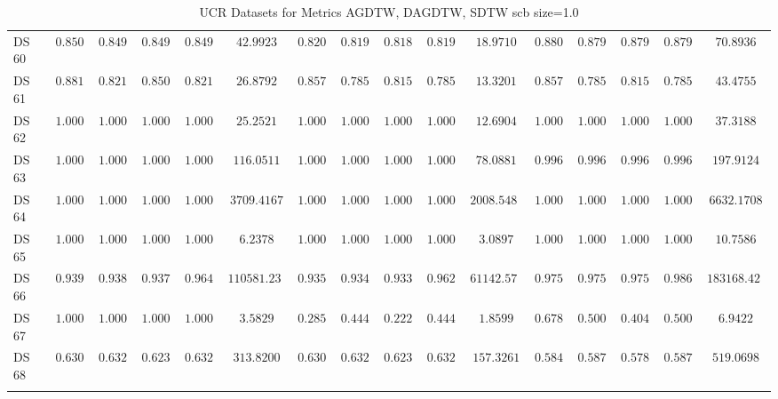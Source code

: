 {\begin{longtable}{|l|ccccc|ccccc|ccccc|}
		DS 60 & $0.8507$ & $0.8498$ & $0.8499$ & $0.8498$ & $42.9923$ & $0.8209$ & $0.8195$ & $0.8189$ & $0.8195$ & $18.9710$ & $\boldsymbol{0.8806}$ & $\boldsymbol{0.8792}$ & $\boldsymbol{0.8793}$ & $\boldsymbol{0.8792}$ & $70.8936$ \\
		DS 61 & $\boldsymbol{0.8810}$ & $\boldsymbol{0.8214}$ & $\boldsymbol{0.8503}$ & $\boldsymbol{0.8214}$ & $26.8792$ & $0.8571$ & $0.7857$ & $0.8152$ & $0.7857$ & $13.3201$ & $0.8571$ & $0.7857$ & $0.8152$ & $0.7857$ & $43.4755$ \\
		DS 62 & $1.0000$ & $1.0000$ & $1.0000$ & $1.0000$ & $25.2521$ & $1.0000$ & $1.0000$ & $1.0000$ & $1.0000$ & $12.6904$ & $\boldsymbol{1.0000}$ & $\boldsymbol{1.0000}$ & $\boldsymbol{1.0000}$ & $\boldsymbol{1.0000}$ & $37.3188$ \\
		DS 63 & $\boldsymbol{1.0000}$ & $\boldsymbol{1.0000}$ & $\boldsymbol{1.0000}$ & $\boldsymbol{1.0000}$ & $116.0511$ & $1.0000$ & $1.0000$ & $1.0000$ & $1.0000$ & $78.0881$ & $0.9966$ & $0.9966$ & $0.9966$ & $0.9966$ & $197.9124$ \\
		DS 64 & $1.0000$ & $1.0000$ & $1.0000$ & $1.0000$ & $3709.4167$ & $1.0000$ & $1.0000$ & $1.0000$ & $1.0000$ & $2008.5487$ & $\boldsymbol{1.0000}$ & $\boldsymbol{1.0000}$ & $\boldsymbol{1.0000}$ & $\boldsymbol{1.0000}$ & $6632.1708$ \\
		DS 65 & $1.0000$ & $1.0000$ & $1.0000$ & $1.0000$ & $6.2378$ & $1.0000$ & $1.0000$ & $1.0000$ & $1.0000$ & $3.0897$ & $\boldsymbol{1.0000}$ & $\boldsymbol{1.0000}$ & $\boldsymbol{1.0000}$ & $\boldsymbol{1.0000}$ & $10.7586$ \\
		DS 66 & $0.9393$ & $0.9380$ & $0.9377$ & $0.9646$ & $110581.2394$ & $0.9357$ & $0.9343$ & $0.9337$ & $0.9624$ & $61142.5727$ & $\boldsymbol{0.9759}$ & $\boldsymbol{0.9757}$ & $\boldsymbol{0.9759}$ & $\boldsymbol{0.9861}$ & $183168.4278$ \\
		DS 67 & $1.0000$ & $1.0000$ & $1.0000$ & $1.0000$ & $3.5829$ & $0.2857$ & $0.4444$ & $0.2222$ & $0.4444$ & $1.8599$ & $0.6786$ & $0.5000$ & $0.4043$ & $0.5000$ & $6.9422$ \\
		DS 68 & $\boldsymbol{0.6308}$ & $\boldsymbol{0.6325}$ & $\boldsymbol{0.6236}$ & $\boldsymbol{0.6325}$ & $313.8200$ & $0.6308$ & $0.6325$ & $0.6236$ & $0.6325$ & $157.3261$ & $0.5846$ & $0.5875$ & $0.5782$ & $0.5875$ & $519.0698$ \\
		\hline
		\caption{UCR Datasets for Metrics AGDTW, DAGDTW, SDTW \gls{scb} size=1.0}
		\label{tab:UCR_agdtw-dagdtw-sdtw_scb_size=1.0}
	\end{longtable}
}
